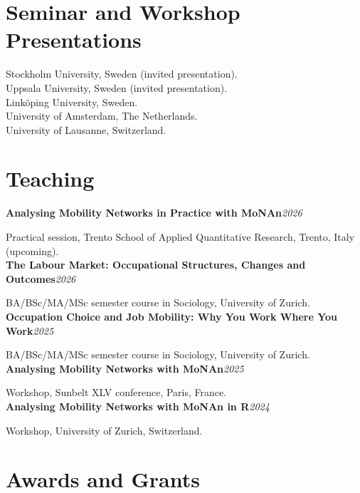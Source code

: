 \documentclass[11pt,a4paper]{article}
\newcommand{\entrynodetail}[2]{%
    \noindent\textbf{#1}\hfill\textit{\color{lighttext}#2}\par\vspace{0.1em}
}
\newcommand{\yr}[1]{\makebox[3em][l]{\textbf{#1}}}
\begin{document}
\section{Seminar and Workshop Presentations}

\yr{2026}Stockholm University, Sweden (invited presentation).\\
\yr{}Uppsala University, Sweden (invited presentation).\\
\yr{}Link\"oping University, Sweden.\\[0.2em]
\yr{2025}University of Amsterdam, The Netherlands.\\[0.2em]
\yr{2024}University of Lausanne, Switzerland.

\section{Teaching}

\entrynodetail{Analysing Mobility Networks in Practice with MoNAn}{2026}
{\small\color{lighttext} Practical session, Trento School of Applied Quantitative Research, Trento, Italy (upcoming).}\\[0.2em]
\entrynodetail{The Labour Market: Occupational Structures, Changes and Outcomes}{2026}
{\small\color{lighttext} BA/BSc/MA/MSc semester course in Sociology, University of Zurich.}\\[0.2em]
\entrynodetail{Occupation Choice and Job Mobility: Why You Work Where You Work}{2025}
{\small\color{lighttext} BA/BSc/MA/MSc semester course in Sociology, University of Zurich.}\\[0.2em]
\entrynodetail{Analysing Mobility Networks with MoNAn}{2025}
{\small\color{lighttext} Workshop, Sunbelt XLV conference, Paris, France.}\\[0.2em]
\entrynodetail{Analysing Mobility Networks with MoNAn in R}{2024}
{\small\color{lighttext} Workshop, University of Zurich, Switzerland.}

\section{Awards and Grants}
\end{document}
